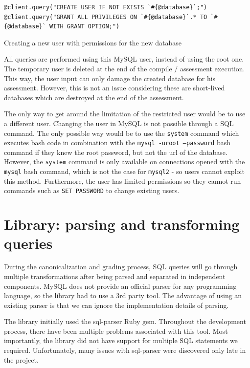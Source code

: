 \begin{code}
\begin{verbatim}
@client.query("CREATE USER IF NOT EXISTS `#{@database}`;")
@client.query("GRANT ALL PRIVILEGES ON `#{@database}`.* TO `#{@database}` WITH GRANT OPTION;")
\end{verbatim}
\caption{Creating a new user with permissions for the new database}
\label{fig:creating_new_user}
\end{code}

All queries are performed using this MySQL user, instead of using the root one. The temporary user is deleted at the end of the compile / assessment execution. This way, the user input can only damage the created database for his assessment. However, this is not an issue considering these are short-lived databases which are destroyed at the end of the assessment.

The only way to get around the limitation of the restricted user would be to use a different user. Changing the user in MySQL is not possible through a SQL command. The only possible way would be to use the \texttt{system} command which executes bash code in combination with the \texttt{mysql -uroot --password} bash command if they knew the root password, but not the url of the database. However, the \texttt{system} command is only available on connections opened with the \texttt{mysql} bash command, which is not the case for \texttt{mysql2} - so users cannot exploit this method. Furthermore, the user has limited permissions so they cannot run commands such as \texttt{SET PASSWORD} to change existing users.

\section{Library: parsing and transforming queries}

During the canonicalization and grading process, SQL queries will go through multiple transformations after being parsed and separated in independent components. MySQL does not provide an official parser for any programming language, so the library had to use a 3rd party tool. The advantage of using an existing parser is that we can ignore the implementation details of parsing.

The library initially used the sql-parser Ruby gem. Throughout the development process, there have been multiple problems associated with this tool. Most importantly, the library did not have support for multiple SQL statements we required. Unfortunately, many issues with sql-parser were discovered only late in the project.

